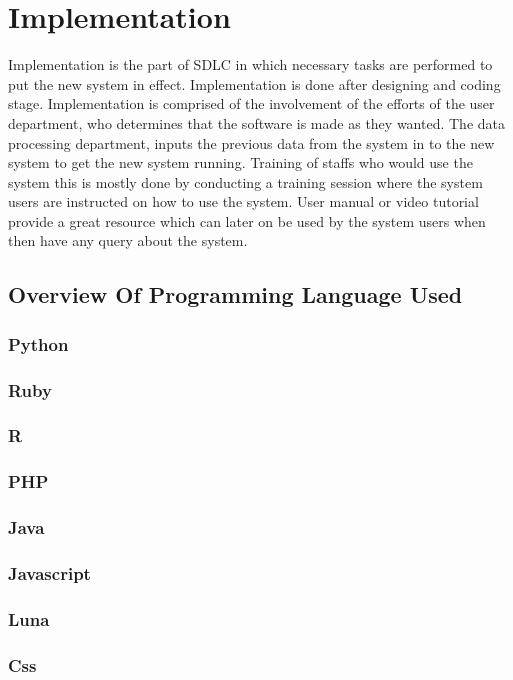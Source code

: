\chapter{Implementation}
Implementation is the part of SDLC in which necessary tasks are performed to put the new
system in effect.
Implementation is done after designing and coding stage. Implementation is comprised of
the involvement of the efforts of the user department, who determines that the software
is made as they wanted. The data processing department, inputs the previous data from the
system in to the new system to get the new system running. Training of staffs who would use
the system this is mostly done by conducting a training session where the system users are
instructed on how to use the system. User manual or video tutorial provide a great resource
which can later on be used by the system users when then have any query about the
system.


\section{Overview Of Programming Language Used}
\subsection{Python}
\subsection{Ruby}
\subsection{R}
\subsection{PHP}
\subsection{Java}
\subsection{Javascript}
\subsection{Luna}
\subsection{Css}


